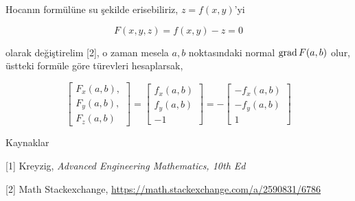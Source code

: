\documentclass[12pt,fleqn]{article}\usepackage{../../common}
\begin{document}
Hocanın formülüne su şekilde erisebiliriz, $z = f(x,y)$'yi

$$
F(x,y,z) = f(x,y) - z = 0
$$

olarak değiştirelim [2], o zaman mesela $a,b$ noktasındaki normal $\operatorname{grad} F(a,b)$
olur, üstteki formüle göre türevleri hesaplarsak,

$$
\left[\begin{array}{c}
F_x(a,b), \\ F_y(a,b), \\F_z(a,b)
\end{array}\right]
=
\left[\begin{array}{c}
f_x(a,b) \\
f_y(a,b) \\
-1
\end{array}\right]
= - \left[\begin{array}{c}
-f_x(a,b) \\
-f_y(a,b) \\
1
\end{array}\right]
$$



Kaynaklar

[1] Kreyzig, {\em Advanced Engineering Mathematics, 10th Ed}

[2] Math Stackexchange, \url{https://math.stackexchange.com/a/2590831/6786}
\end{document}
